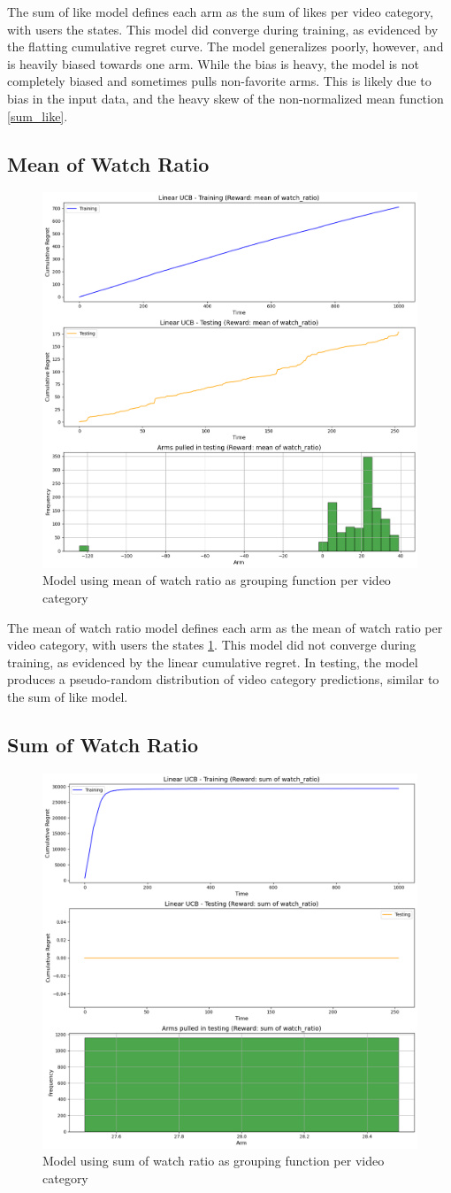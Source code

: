 The sum of like model defines each arm as the sum of likes per video category, with users the states. This model did converge during training, as evidenced by the flatting cumulative regret curve. The model generalizes poorly, however, and is heavily biased towards one arm. While the bias is heavy, the model is not completely biased and sometimes pulls non-favorite arms. This is likely due to bias in the input data, and the heavy skew of the non-normalized mean function \ref{sum_like}.

\subsection{Mean of Watch Ratio}

\begin{figure}
    \centering
    \includegraphics[width=0.5\linewidth]{mean_watchratio.png}
    \caption{Model using mean of watch ratio as grouping function per video category}
    \label{mean_watchratio}
\end{figure}

The mean of watch ratio model defines each arm as the mean of watch ratio per video category, with users the states \ref{mean_watchratio}. This model did not converge during training, as evidenced by the linear cumulative regret. In testing, the model produces a pseudo-random distribution of video category predictions, similar to the sum of like model.

\subsection{Sum of Watch Ratio}

\begin{figure}
    \centering
    \includegraphics[width=0.5\linewidth]{summary_report/sum_watchratio.png}
    \caption{Model using sum of watch ratio as grouping function per video category}
    \label{sum_watchratio}
\end{figure}

